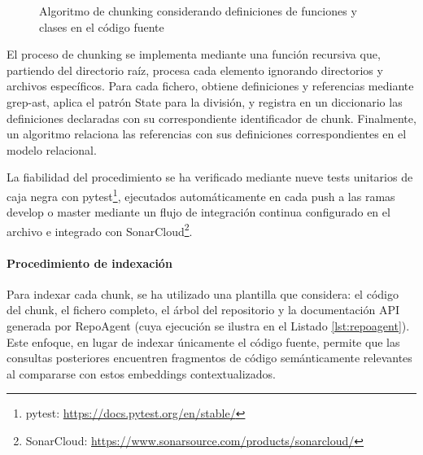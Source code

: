 \begin{figure}[h]
\centering
{}
\caption{Algoritmo de chunking considerando definiciones de funciones y clases en el código fuente}
\label{fig:state_pattern}
\end{figure}
El proceso de chunking se implementa mediante una función recursiva que, partiendo del directorio raíz, procesa cada elemento ignorando directorios y archivos específicos. Para cada fichero, obtiene definiciones y referencias mediante grep-ast, aplica el patrón State para la división, y registra en un diccionario las definiciones declaradas con su correspondiente identificador de chunk. Finalmente, un algoritmo relaciona las referencias con sus definiciones correspondientes en el modelo relacional.

La fiabilidad del procedimiento se ha verificado mediante nueve tests unitarios de caja negra con pytest\footnote{pytest: \url{https://docs.pytest.org/en/stable/}}, ejecutados automáticamente en cada push a las ramas develop o master mediante un flujo de integración continua configurado en el archivo  e integrado con SonarCloud\footnote{SonarCloud: \url{https://www.sonarsource.com/products/sonarcloud/}}.
\paragraph{Procedimiento de indexación}
Para indexar cada chunk, se ha utilizado una plantilla que considera: el código del chunk, el fichero completo, el árbol del repositorio y la documentación API generada por RepoAgent (cuya ejecución se ilustra en el Listado \ref{lst:repoagent}). Este enfoque, en lugar de indexar únicamente el código fuente, permite que las consultas posteriores encuentren fragmentos de código semánticamente relevantes al compararse con estos embeddings contextualizados.

